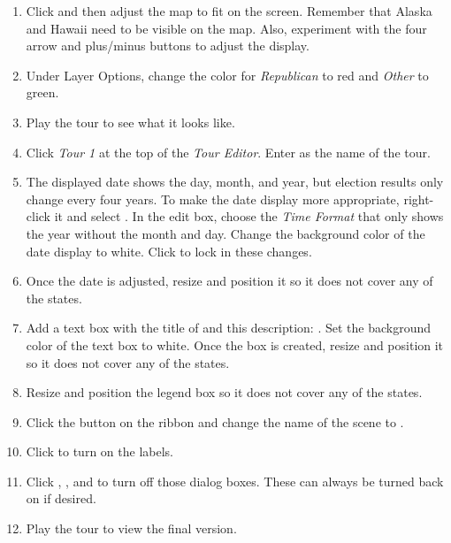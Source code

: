 \begin{enumerate}
	\item Click  and then adjust the map to fit on the screen. Remember that Alaska and Hawaii need to be visible on the map. Also, experiment with the four arrow and plus/minus buttons to adjust the display.
	\item Under Layer Options, change the color for \textit{Republican} to red and \textit{Other} to green.
	\item Play the tour to see what it looks like.
	\item Click \textit{Tour 1} at the top of the \textit{Tour Editor}. Enter  as the name of the tour. 
	\item The displayed date shows the day, month, and year, but election results only change every four years. To make the date display more appropriate, right-click it and select . In the edit box, choose the \textit{Time Format} that only shows the year without the month and day. Change the background color of the date display to white. Click  to lock in these changes. 
	\item Once the date is adjusted, resize and position it so it does not cover any of the states. 
	\item Add a text box with the title of  and this description: . Set the background color of the text box to white. Once the box is created, resize and position it so it does not cover any of the states.
	\item Resize and position the legend box so it does not cover any of the states.
	\item Click the  button on the ribbon and change the name of the scene to .
	\item Click  to turn on the labels.
	\item Click , , and  to turn off those dialog boxes. These can always be turned back on if desired.
	\item Play the tour to view the final version.
	

\end{enumerate}
